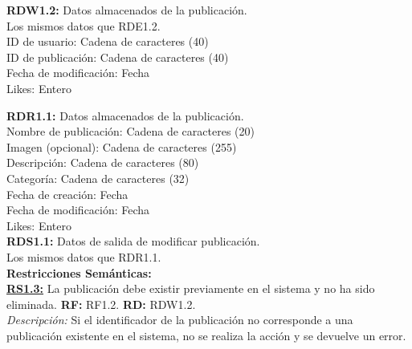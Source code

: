 \textcolor{azul}{\textbf{RDW1.2:}} Datos almacenados de la publicación. \\
\hspace*{1cm} Los mismos datos que RDE1.2.\\
\hspace*{1cm} ID de usuario: Cadena de caracteres (40) \\
\hspace*{1cm} ID de publicación: Cadena de caracteres (40) \\
\hspace*{1cm} Fecha de modificación: Fecha \\
\hspace*{1cm} Likes: Entero \\[12pt]
\pagebreak


\textcolor{azul}{\textbf{RDR1.1:}} Datos almacenados de la publicación. \\
\hspace*{1cm} Nombre de publicación: Cadena de caracteres (20) \\
\hspace*{1cm} Imagen (opcional): Cadena de caracteres (255) \\
\hspace*{1cm} Descripción: Cadena de caracteres (80) \\ 
\hspace*{1cm} Categoría: Cadena de caracteres (32) \\
\hspace*{1cm} Fecha de creación: Fecha \\
\hspace*{1cm} Fecha de modificación: Fecha \\
\hspace*{1cm} Likes: Entero \\[12pt]

\textcolor{azul}{\textbf{RDS1.1:}} Datos de salida de modificar publicación. \\
\hspace*{1cm} Los mismos datos que RDR1.1.\\[12pt]

\textbf{\textcolor{verde}{Restricciones Semánticas:}} \\[6pt]
\textbf{\textcolor{verde}{\underline{RS1.3:}}} La publicación debe existir previamente en el sistema y no ha sido eliminada. \textbf{RF:} RF1.2. \textbf{RD:} RDW1.2. \\
\hspace*{1cm} \textit{Descripción:} Si el identificador de la publicación no corresponde
a una publicación existente en el sistema, no se realiza la acción y se devuelve un error. \\[12pt]

